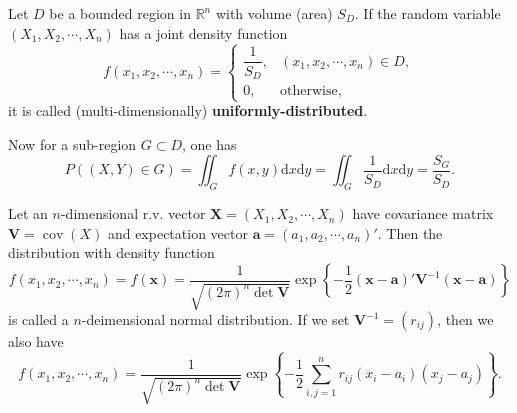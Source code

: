 \documentclass[11pt,singlecolumn, openany, citestyle=authoryear]{elegantbook}
\begin{document}
\begin{CJK}{UTF8}{gbsn}
\begin{example}
    Let $D$ be a bounded region in $\mathbb{R}^n$ with volume (area) $S_D$. If the random variable
    $(X_1,X_2,\cdots,X_n)$ has a joint density function
    \begin{equation}
        f(x_1,x_2,\cdots,x_n)=
        \begin{cases}
            \dfrac{1}{S_D}, & (x_1,x_2,\cdots,x_n) \in D, \\
            0,& \text{otherwise},
        \end{cases}
    \end{equation}
    it is called (multi-dimensionally) \textbf{uniformly-distributed}.

    Now for a sub-region $G \subset D$, one has 
    $$
    P((X,Y)\in G)=\iint_G f(x,y)\mathrm{d}x\mathrm{d}y = 
    \iint_G \frac{1}{S_D}\mathrm{d}x\mathrm{d}y = \frac{S_G}{S_D}. 
    $$
\end{example}

\begin{example}
    Let an $n$-dimensional r.v. vector $\boldsymbol{X}=(X_1,X_2,\cdots,X_n)$ have covariance
    matrix $\boldsymbol{V}=\operatorname{cov}(X)$ and expectation vector $\boldsymbol{a}=
    (a_1,a_2,\cdots,a_n)'$. Then the distribution with density function 
    $$
    f(x_1,x_2,\cdots,x_n)=f(\boldsymbol{x})=\frac{1}{\sqrt{(2\pi)^n\det \boldsymbol{V}}}
    \operatorname{exp}\left\{
        -\frac{1}{2}(\boldsymbol{x}-\boldsymbol{a})'\boldsymbol{V}^{-1}(\boldsymbol{x}-\boldsymbol{a})
    \right\}
    $$
    is called a $n$-deimensional normal distribution. If we set $\boldsymbol{V}^{-1}=(r_{ij})$, then 
    we also have 
    $$
    f(x_1,x_2,\cdots,x_n)=\frac{1}{\sqrt{(2\pi)^n\det \boldsymbol{V}}}
    \operatorname{exp}\left\{
        -\frac{1}{2}\sum_{i,j=1}^n r_{ij}(x_i-a_i)(x_j-a_j)
    \right\}.
    $$
\end{example}


\end{CJK}
\end{document}
